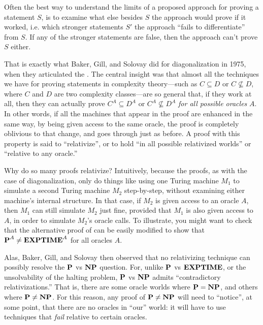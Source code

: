 Often the best way to understand the limits of a proposed approach for proving a statement $S$, is to examine what else besides $S$ the approach would prove if it worked, i.e. which stronger statements $S'$ the approach ``fails to differentiate'' from $S$. If any of the stronger statements are false, then the approach can't prove $S$ either.

That is exactly what Baker, Gill, and Solovay \cite{baker1975relativizations} did for diagonalization in 1975, when they articulated the . The central insight was that almost all the techniques we have for proving statements in complexity theory—such as $C \subseteq D$ or $C \not\subseteq D$, where $C$ and $D$ are two complexity classes—are so general that, if they work at all, then they can actually prove $C^A \subseteq D^A$ or $C^A \not\subseteq D^A$ \emph{for all possible oracles} $A$. In other words, if all the machines that appear in the proof are enhanced in the same way, by being given access to the same oracle, the proof is completely oblivious to that change, and goes through just as before. A proof with this property is said to ``relativize'', or to hold ``in all possible relativized worlds'' or ``relative to any oracle.''

Why do so many proofs relativize? Intuitively, because the proofs, as with the case of diagonalization, only do things like using one Turing machine $M_1$ to simulate a second Turing machine $M_2$ step-by-step, without examining either machine's internal structure. In that case, if $M_2$ is given access to an oracle $A$, then $M_1$ can still simulate $M_2$ just fine, provided that $M_1$ is also given access to $A$, in order to simulate $M_2$'s oracle calls. To illustrate, you might want to check that the alternative proof of  can be easily modified to show that $\textbf{P}^A \neq \textbf{EXPTIME}^A$ for all oracles $A$.

Alas, Baker, Gill, and Solovay then observed that no relativizing technique can possibly resolve the $\textbf{P}$ vs $\textbf{NP}$ question. For, unlike $\textbf{P}$ vs $\textbf{EXPTIME}$, or the unsolvability of the halting problem, $\textbf{P}$ vs $\textbf{NP}$ admits ``contradictory relativizations.'' That is, there are some oracle worlds where $\textbf{P} = \textbf{NP}$, and others where $\textbf{P} \neq \textbf{NP}$. For this reason, any proof of $\textbf{P} \neq \textbf{NP}$ will need to ``notice'', at some point, that there are no oracles in ``our'' world: it will have to use techniques that \emph{fail} relative to certain oracles.

